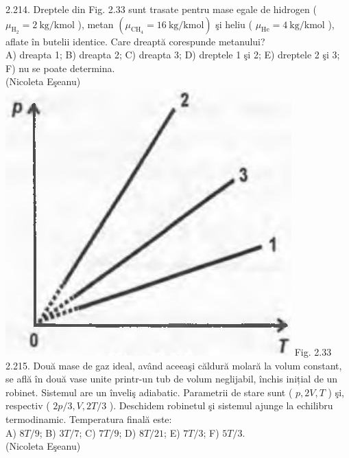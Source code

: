 \documentclass[10pt]{article}
\begin{document}
2.214. Dreptele din Fig. 2.33 sunt trasate pentru mase egale de hidrogen ( $\mu_{\mathrm{H}_{2}}=2 \mathrm{~kg} / \mathrm{kmol}$ ), metan $\left(\mu_{\mathrm{CH}_{4}}=16 \mathrm{~kg} / \mathrm{kmol}\right)$ şi heliu ( $\mu_{\mathrm{He}}=4 \mathrm{~kg} / \mathrm{kmol}$ ), aflate în butelii identice. Care dreaptă corespunde metanului?\\ A) dreapta 1; B) dreapta 2; C) dreapta 3; D) dreptele 1 şi 2; E) dreptele 2 şi 3; F) nu se poate determina.\\ (Nicoleta Eşeanu)\\ \includegraphics[max width=\textwidth, center]{2025_07_01_5b3ff9fa0d508c8e9f17g-122} Fig. 2.33\\

2.215. Două mase de gaz ideal, având aceeaşi căldură molară la volum constant, se află în două vase unite printr-un tub de volum neglijabil, închis inițial de un robinet. Sistemul are un înveliş adiabatic. Parametrii de stare sunt ( $p, 2 V, T$ ) şi, respectiv ( $2 p / 3, V, 2 T / 3$ ). Deschidem robinetul şi sistemul ajunge la echilibru termodinamic. Temperatura finală este:\\ A) $8 T / 9$; B) $3 T / 7$; C) $7 T / 9$; D) $8 T / 21$; E) $7 T / 3$; F) $5 T / 3$.\\ (Nicoleta Eşeanu)\\
\end{document}
